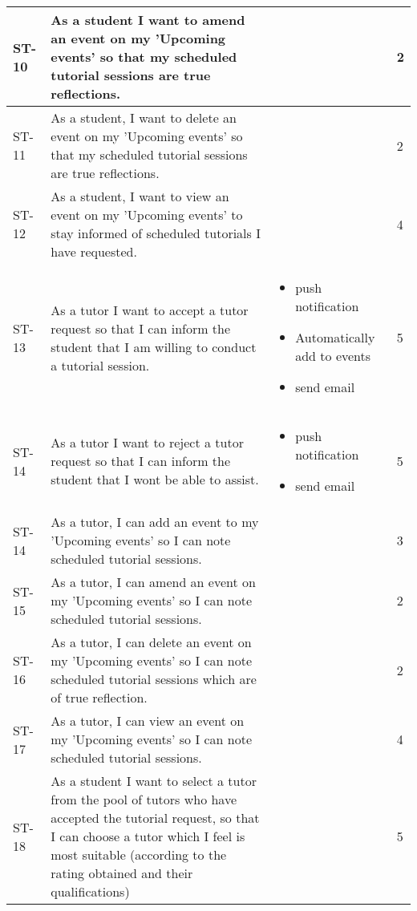 \documentclass[12pt]{article}
\begin{document}
{\begin{longtable}{| p{1cm} | p{7cm}| p{5cm} | p{1cm} |}
			\\ \hline ST-10 & As a student I want to amend an event on my 'Upcoming events' so that my scheduled tutorial sessions are true reflections.  & & 2 
			
			\\ \hline ST-11 & As a student, I want to delete an event on my 'Upcoming events' so that my scheduled tutorial sessions are true reflections. & & 2 	
			
			\\ \hline ST-12 & As a student, I want to  view an event on my 'Upcoming events' to stay informed of scheduled tutorials I have requested. & & 4 
			
			\\ \hline ST-13 & As a tutor I want to accept a tutor request so that I can inform the student that I am willing to conduct a tutorial session.  & \begin{itemize}
\item push notification
\item Automatically add to events
\item send email
\end{itemize} &5 			
						
						\\ \hline ST-14 & As a tutor I want to  reject a tutor request so that I can inform the student that I wont be able to assist.   & \begin{itemize}
\item push notification
\item send email
\end{itemize} & 5 									
			
			\\ \hline ST-14 & As a tutor, I can  add an event to my 'Upcoming events' so I can note scheduled tutorial sessions.  & & 3 
			
			\\ \hline ST-15 & As a tutor, I can  amend an event on my 'Upcoming events' so I can note scheduled tutorial sessions. & & 2 
			
			\\ \hline ST-16 & As a tutor, I can  delete an event on my 'Upcoming events' so I can note scheduled tutorial sessions which are of true reflection. & & 2 
			
			\\ \hline ST-17 & As a tutor, I can  view an event on my 'Upcoming events'   so I can note scheduled tutorial sessions.& & 4

			\\ \hline ST-18 & As a student I want to select a tutor from the pool of tutors who have accepted the tutorial request, so that I can choose a tutor which I feel is most suitable (according to the rating obtained and their qualifications)  & &5 
			

\end{longtable}}
\end{document}
